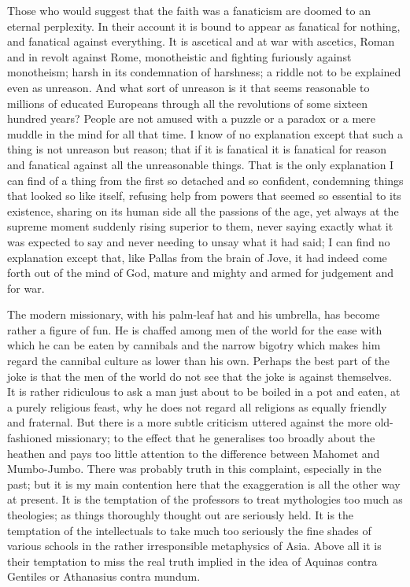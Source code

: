 Those who would suggest that the faith was a fanaticism are doomed to an eternal perplexity. In their account it is bound to appear as fanatical for nothing, and fanatical against everything. It is ascetical and at war with ascetics, Roman and in revolt against Rome, monotheistic and fighting furiously against monotheism; harsh in its condemnation of harshness; a riddle not to be explained even as unreason. And what sort of unreason is it that seems reasonable to millions of educated Europeans through all the revolutions of some sixteen hundred years? People are not amused with a puzzle or a paradox or a mere muddle in the mind for all that time. I know of no explanation except that such a thing is not unreason but reason; that if it is fanatical it is fanatical for reason and fanatical against all the unreasonable things. That is the only explanation I can find of a thing from the first so detached and so confident, condemning things that looked so like itself, refusing help from powers that seemed so essential to its existence, sharing on its human side all the passions of the age, yet always at the supreme moment suddenly rising superior to them, never saying exactly what it was expected to say and never needing to unsay what it had said; I can find no explanation except that, like Pallas from the brain of Jove, it had indeed come forth out of the mind of God, mature and mighty and armed for judgement and for war.


The modern missionary, with his palm-leaf hat and his umbrella, has become rather a figure of fun. He is chaffed among men of the world for the ease with which he can be eaten by cannibals and the narrow bigotry which makes him regard the cannibal culture as lower than his own. Perhaps the best part of the joke is that the men of the world do not see that the joke is against themselves. It is rather ridiculous to ask a man just about to be boiled in a pot and eaten, at a purely religious feast, why he does not regard all religions as equally friendly and fraternal. But there is a more subtle criticism uttered against the more old-fashioned missionary; to the effect that he generalises too broadly about the heathen and pays too little attention to the difference between Mahomet and Mumbo-Jumbo. There was probably truth in this complaint, especially in the past; but it is my main contention here that the exaggeration is all the other way at present. It is the temptation of the professors to treat mythologies too much as theologies; as things thoroughly thought out are seriously held. It is the temptation of the intellectuals to take much too seriously the fine shades of various schools in the rather irresponsible metaphysics of Asia. Above all it is their temptation to miss the real truth implied in the idea of Aquinas contra Gentiles or Athanasius contra mundum.

